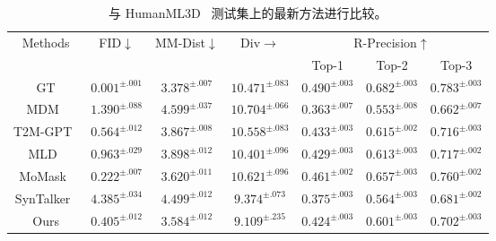 \begin{table*}[t]
  \centering
  \caption{与 HumanML3D~\cite{guo2022humanml3d} 测试集上的最新方法进行比较。}%
  \label{tab:h3d_results}
  \small
  \begin{tabular}{c cccccc}
  \toprule
  \multirow{2}{*}{Methods} & \multirow{2}{*}{FID$\downarrow$} & \multirow{2}{*}{MM-Dist$\downarrow$} & \multirow{2}{*}{Div$\rightarrow$} & \multicolumn{3}{c}{R-Precision$\uparrow$} \\
  \cmidrule(lr){5-7}
  & & & & Top-1 & Top-2 & Top-3 \\
  \midrule
  GT  &  $0.001^{\pm .001}$ & $3.378^{\pm .007}$ & $10.471^{\pm .083}$ &  $0.490^{\pm .003}$ & $0.682^{\pm .003}$ & $0.783^{\pm .003}$ \\
  MDM~\cite{tevet2022mdm} & $1.390^{\pm .088}$ & $4.599^{\pm .037}$ & $10.704^{\pm .066}$ & $0.363^{\pm .007}$ & $0.553^{\pm .008}$ & $0.662^{\pm .007}$ \\
  T2M-GPT~\cite{zhang2023t2mgpt} &  $0.564^{\pm .012}$ & $3.867^{\pm .008}$ & $10.558^{\pm .083}$  & $0.433^{\pm .003}$ & $0.615^{\pm .002}$ & $0.716^{\pm .003}$ \\
  MLD~\cite{chen2023executing} & $0.963^{\pm .029}$ & $3.898^{\pm .012}$ & $10.401^{\pm .096}$ & $0.429^{\pm .003}$ & $0.613^{\pm .003}$ & $0.717^{\pm .002}$ \\
  MoMask~\cite{guo2024momask} & $0.222^{\pm .007}$ & $3.620^{\pm .011}$ & $10.621^{\pm .096}$ & $0.461^{\pm .002}$ & $0.657^{\pm .003}$ & $0.760^{\pm .002}$ \\
  SynTalker~\cite{chen2024syntalker} & $4.385^{\pm .034}$ & $4.499^{\pm .012}$ & $9.374^{\pm .073}$ & $0.375^{\pm .003}$ & $0.564^{\pm .003}$ & $0.681^{\pm .002}$ \\
  Ours  & $0.405^{\pm .012}$ & $3.584^{\pm .012}$ & $9.109^{\pm .235}$  & $0.424^{\pm .003}$ &$0.601^{\pm .003}$ & $0.702^{\pm .003}$ \\
  \bottomrule
  \end{tabular}
\end{table*}

